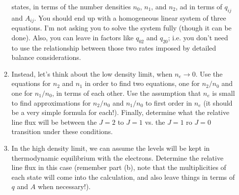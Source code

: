 \documentclass[11pt, preprint]{article}
\begin{document}
\begin{enumerate}
\begin{enumerate}
    states, in terms of the number densities $n_0$, $n_1$, and $n_2$,
    ad in terms of $q_{ij}$ and $A_{ij}$.  You should end up with a
    homogeneous linear system of three equations. I'm not asking you
    to solve the system fully (though it can be done). Also, you can
    leave in factors like $q_{02}$ and $q_{20}$; i.e. you don't need
    to use the relationship between those two rates imposed by
    detailed balance considerations.
  \item Instead, let's think about the low density limit, when
    $n_e\rightarrow 0$. Use the equations for $n_2$ and $n_1$ in order
    to find two equations, one for $n_2/n_0$ and one for $n_1/n_0$, in
    terms of each other. Use the assumption that $n_e$ is small to
    find approximations for $n_2/n_0$ and $n_1/n_0$ to first order in
    $n_e$ (it should be a very simple formula for each!). Finally,
    determine what the relative line flux will be between the $J=2$ to
    $J=1$ vs. the $J=1$ ro $J=0$ transition under these conditions.
  \item In the high density limit, we can assume the levels will be
    kept in thermodynamic equilibrium with the electrons. Determine
    the relative line flux in this case (remember part (b), note that
    the multiplicities of each state will come into the calculation,
    and also leave things in terms of $q$ and $A$ when necessary!).
\end{enumerate}
\end{enumerate}
\end{document}
